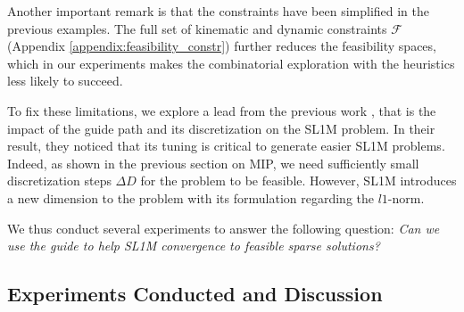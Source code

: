 Another important remark is that the constraints have been simplified in the previous examples.
The full set of kinematic and dynamic constraints $\mathcal{F}$ (Appendix \ref{appendix:feasibility_constr}) further reduces the feasibility spaces, which in our experiments makes the combinatorial exploration with the heuristics less likely to succeed. 

To fix these limitations, we explore a lead from the previous work \cite{sl1m_v2}, that is the impact of the guide path and its discretization on the SL1M problem.
In their result, they noticed that its tuning is critical to generate easier SL1M problems.
Indeed, as shown in the previous section on MIP, we need sufficiently small discretization steps $\Delta D$ for the problem to be feasible. 
However, SL1M introduces a new dimension to the problem with its formulation regarding the $l1$-norm.

We thus conduct several experiments to answer the following question: \textit{Can we use the guide to help SL1M convergence to feasible sparse solutions?}


\subsection{Experiments Conducted and Discussion}

